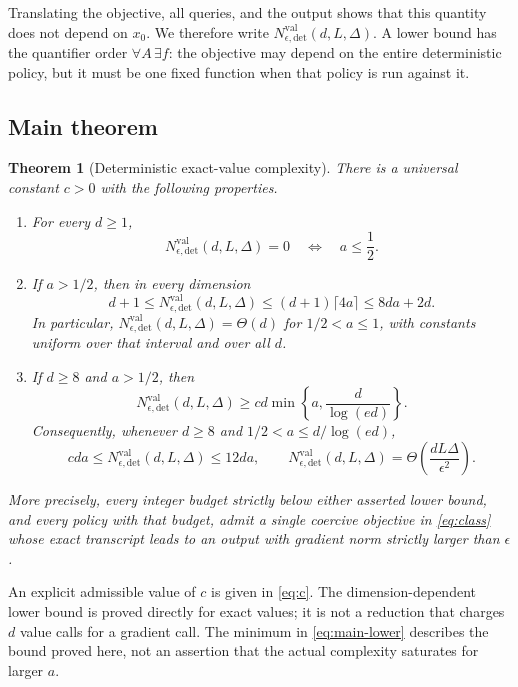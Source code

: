 \documentclass[11pt]{article}
\numberwithin{equation}{section}
\newtheorem{theorem}{Theorem}[section]
\theoremstyle{definition}
\theoremstyle{remark}
\newcommand{\Nval}{N_{\epsilon,\mathrm{det}}^{\mathrm{val}}}
\begin{document}
Translating the objective, all queries, and the output shows that this
quantity does not depend on $x_0$. We therefore write
$\Nval(d,L,\Delta)$. A lower bound has the quantifier order
$\forall A\,\exists f$: the objective may depend on the entire deterministic
policy, but it must be one fixed function when that policy is run against it.

\subsection{Main theorem}

\begin{theorem}[Deterministic exact-value complexity]
\label{thm:main}
There is a universal constant $c>0$ with the following properties.
\begin{enumerate}[label=(\roman*)]
\item For every $d\geq1$,
\begin{equation}
    \Nval(d,L,\Delta)=0
    \quad\Longleftrightarrow\quad a\leq\frac12.
    \label{eq:threshold}
\end{equation}
\item If $a>1/2$, then in every dimension
\begin{equation}
    d+1\leq\Nval(d,L,\Delta)
    \leq(d+1)\lceil4a\rceil
    \leq8da+2d.
    \label{eq:basic-bounds}
\end{equation}
In particular, $\Nval(d,L,\Delta)=\Theta(d)$ for
$1/2<a\leq1$, with constants uniform over that interval and over all $d$.
\item If $d\geq8$ and $a>1/2$, then
\begin{equation}
    \Nval(d,L,\Delta)
    \geq c d\min\!\left\{a,\frac{d}{\log(ed)}\right\}.
    \label{eq:main-lower}
\end{equation}
Consequently, whenever $d\geq8$ and
$1/2<a\leq d/\log(ed)$,
\begin{equation}
    cda\leq\Nval(d,L,\Delta)\leq12da,
    \qquad
    \Nval(d,L,\Delta)=\Theta\!\left(\frac{dL\Delta}{\epsilon^2}\right).
    \label{eq:matching}
\end{equation}
\end{enumerate}
More precisely, every integer budget strictly below either asserted lower
bound, and every policy with that budget, admit a single coercive objective
in \eqref{eq:class} whose exact transcript leads to an output with gradient
norm strictly larger than $\epsilon$.
\end{theorem}

An explicit admissible value of $c$ is given in \eqref{eq:c}.
The dimension-dependent lower bound is proved directly for exact values;
it is not a reduction that charges $d$ value calls for a gradient call.
The minimum in \eqref{eq:main-lower} describes the bound proved here, not an
assertion that the actual complexity saturates for larger $a$.
\end{document}
